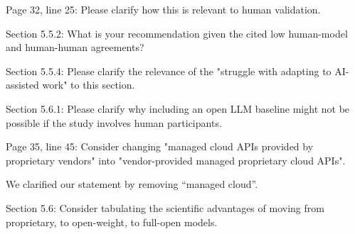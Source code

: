 \documentclass[12pt,english]{reviewresponse}
\begin{document}
\begin{revcomment}
Page 32, line 25: Please clarify how this is relevant to human validation.
\end{revcomment}
\begin{revresponse}
\end{revresponse}

\begin{revcomment}
Section 5.5.2: What is your recommendation given the cited low human-model and human-human agreements?
\end{revcomment}
\begin{revresponse}
\end{revresponse}

\begin{revcomment}
Section 5.5.4: Please clarify the relevance of the "struggle with adapting to AI-assisted work" to this section.
\end{revcomment}
\begin{revresponse}
\end{revresponse}

\begin{revcomment}
Section 5.6.1: Please clarify why including an open LLM baseline might not be possible if the study involves human participants.
\end{revcomment}
\begin{revresponse}
\end{revresponse}

\begin{revcomment}
Page 35, line 45: Consider changing "managed cloud APIs provided by proprietary vendors" into "vendor-provided managed proprietary cloud APIs".
\end{revcomment}
\begin{revresponse}
    We clarified our statement by removing ``managed cloud''.  
\end{revresponse}

\begin{revcomment}
Section 5.6: Consider tabulating the scientific advantages of moving from proprietary, to open-weight, to full-open models.
\end{revcomment}
\begin{revresponse}
\end{revresponse}
\end{document}

